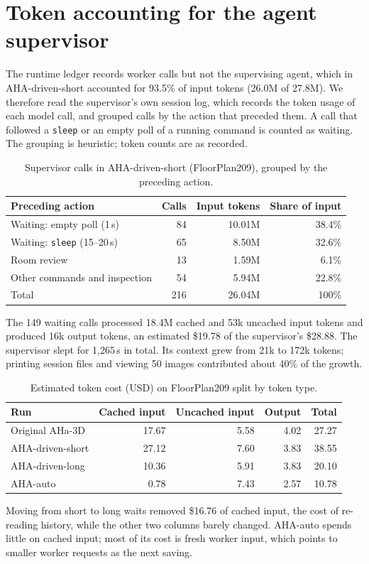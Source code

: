\section{Token accounting for the agent supervisor}
\label{app:tokens}

The runtime ledger records worker calls but not the supervising agent, which in AHA-driven-short accounted for 93.5\% of input tokens (26.0M of 27.8M). We therefore read the supervisor's own session log, which records the token usage of each model call, and grouped calls by the action that preceded them. A call that followed a \texttt{sleep} or an empty poll of a running command is counted as waiting. The grouping is heuristic; token counts are as recorded.

\begin{table}[h]
\centering
\small
\caption{Supervisor calls in AHA-driven-short (FloorPlan209), grouped by the preceding action.}
\label{tab:supervisor-calls}
\begin{tabular}{lrrr}
\toprule
Preceding action & Calls & Input tokens & Share of input \\
\midrule
Waiting: empty poll (1\,s) & 84 & 10.01M & 38.4\% \\
Waiting: \texttt{sleep} (15--20\,s) & 65 & 8.50M & 32.6\% \\
Room review & 13 & 1.59M & 6.1\% \\
Other commands and inspection & 54 & 5.94M & 22.8\% \\
\midrule
Total & 216 & 26.04M & 100\% \\
\bottomrule
\end{tabular}
\end{table}

The 149 waiting calls processed 18.4M cached and 53k uncached input tokens and produced 16k output tokens, an estimated \$19.78 of the supervisor's \$28.88. The supervisor slept for 1,265\,s in total. Its context grew from 21k to 172k tokens; printing session files and viewing 50 images contributed about 40\% of the growth.

\begin{table}[h]
\centering
\small
\caption{Estimated token cost (USD) on FloorPlan209 split by token type.}
\label{tab:cost-split}
\begin{tabular}{lrrrr}
\toprule
Run & Cached input & Uncached input & Output & Total \\
\midrule
Original AHa-3D & 17.67 & 5.58 & 4.02 & 27.27 \\
AHA-driven-short & 27.12 & 7.60 & 3.83 & 38.55 \\
AHA-driven-long & 10.36 & 5.91 & 3.83 & 20.10 \\
AHA-auto & 0.78 & 7.43 & 2.57 & 10.78 \\
\bottomrule
\end{tabular}
\end{table}

Moving from short to long waits removed \$16.76 of cached input, the cost of re-reading history, while the other two columns barely changed. AHA-auto spends little on cached input; most of its cost is fresh worker input, which points to smaller worker requests as the next saving.
